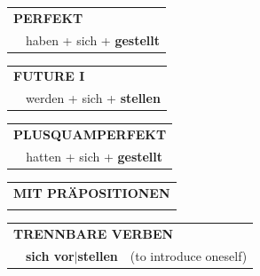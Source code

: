 \documentclass[10pt,a4paper]{revtex4-2}
\begin{document}
\begin{verbbox-acc}
 \begin{tabular}{rl}
     \multicolumn{2}{l}{\textbf{PERFEKT}}\\
    &haben + sich + \textbf{gestellt}\\
  \end{tabular}
\hfill
   \begin{tabular}{rl}
   
    \multicolumn{2}{l}{\textbf{FUTURE I} }\\
    &werden + sich + \textbf{stellen}\\
 
  \end{tabular}
\hfill
   \begin{tabular}{rl}
      \multicolumn{2}{l}{\textbf{PLUSQUAMPERFEKT}}\\
    &hatten + sich + \textbf{gestellt}\\
  \end{tabular}
  
\vspace{10pt}

   \begin{tabular}{lll}
      \multicolumn{3}{l}{\textbf{MIT PRÄPOSITIONEN}}\\
\vspace{0pt}
  \end{tabular}
  \hfill
   \begin{tabular}{lll}
      \multicolumn{3}{l}{\textbf{TRENNBARE VERBEN}}\\
& \textbf{sich vor$|$stellen} & (to introduce oneself)
  \end{tabular}
  
  \vspace{-5pt}

\end{verbbox-acc}
\end{document}
